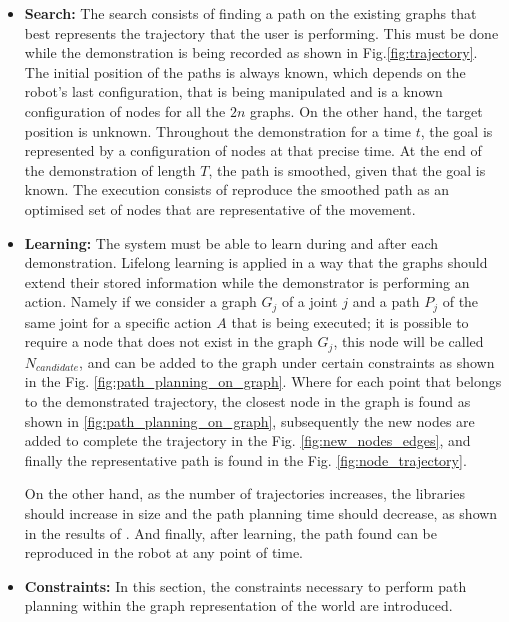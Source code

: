 \documentclass[thesis]{mas_proposal}
\begin{document}
\begin{itemize}    
	
	\item \textbf{Search:}
	The search consists of finding a path on the existing graphs that best represents the trajectory that the user is performing. This must be done while the demonstration is being recorded as shown in Fig.\ref{fig:trajectory}. The initial position of the paths is always known, which depends on the robot's last configuration, that is being manipulated and is a known configuration of nodes for all the $2n$ graphs. On the other hand, the target position is unknown. Throughout the demonstration for a time $t$, the goal is represented by a configuration of nodes at that precise time. At the end of the demonstration of length $T$, the path is smoothed, given that the goal is known. The execution consists of reproduce the smoothed path as an optimised set of nodes that are representative of the movement.
	
	\item \textbf{Learning:}
	The system must be able to learn during and after each demonstration. Lifelong learning is applied in a way that the graphs should extend their stored information while the demonstrator is performing an action. Namely if we consider a graph $G_j$ of a joint $j$ and a path $P_j$ of the same joint for a specific action $A$ that is being executed; it is possible to require a node that does not exist in the graph $G_j$, this node will be called $N_{candidate}$, and can be added to the graph under certain constraints as shown in the Fig. \ref{fig:path_planning_on_graph}. Where for each point that belongs to the demonstrated trajectory, the closest node in the graph is found as shown in \ref{fig:path_planning_on_graph}, subsequently the new nodes are added to complete the trajectory in the Fig. \ref{fig:new_nodes_edges}, and finally the representative path is found in the Fig. \ref{fig:node_trajectory}.
	
	On the other hand, as the number of trajectories increases, the libraries should increase in size and the path planning time should decrease, as shown in the results of \cite{Berenson2012, Coleman2015}. And finally, after learning, the path found can be reproduced in the robot at any point of time. 
	
	\item \textbf{Constraints:}
	In this section, the constraints necessary to perform path planning within the graph representation of the world are introduced.
	

\end{itemize}
\end{document}
